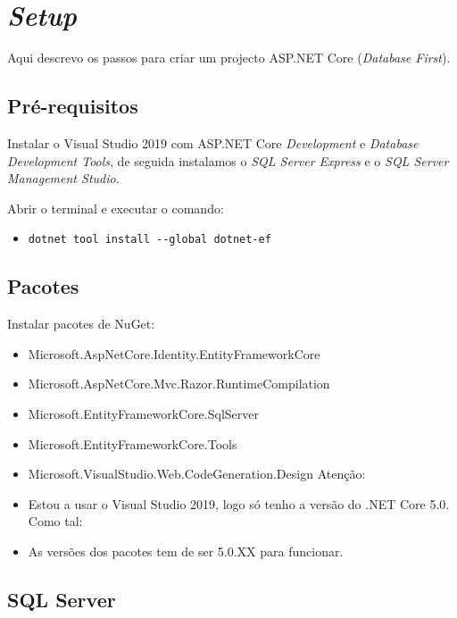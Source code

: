 \chapter{\textit{Setup}}

Aqui descrevo os passos para criar um projecto ASP.NET Core (\textit{Database First}).

\section{Pré-requisitos}

Instalar o Visual Studio 2019 com ASP.NET Core \textit{Development} e \textit{Database  Development Tools}, de seguida instalamos o \textit{SQL Server Express} e o \textit{SQL Server Management Studio}.

Abrir o terminal e executar o comando:

\begin{itemize}

  \item \texttt{dotnet\ tool\ install\ -\/-global\ dotnet-ef}
\end{itemize}

\section{Pacotes}

Instalar pacotes de NuGet:

\begin{itemize}

  \item Microsoft.AspNetCore.Identity.EntityFrameworkCore
  \item Microsoft.AspNetCore.Mvc.Razor.RuntimeCompilation
  \item Microsoft.EntityFrameworkCore.SqlServer
  \item Microsoft.EntityFrameworkCore.Tools
  \item Microsoft.VisualStudio.Web.CodeGeneration.Design Atenção:
  \item Estou a usar o Visual Studio 2019, logo só tenho a versão do .NET Core 5.0. Como tal:
  \item As versões dos pacotes tem de ser 5.0.XX para funcionar.
\end{itemize}

\section{SQL Server}

